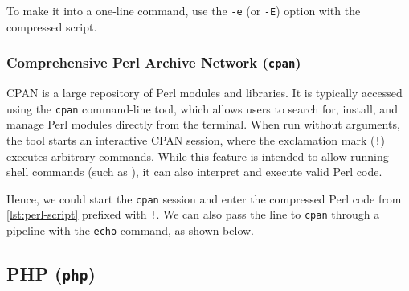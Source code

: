 


To make it into a one-line command, use the \texttt{-e} (or \texttt{-E}) option with the compressed script. \cite{perl-man}


\subsubsection{Comprehensive Perl Archive Network (\texttt{cpan})}
\label{cpan}


CPAN is a large repository of Perl modules and libraries. It is typically accessed using the \texttt{cpan} command-line tool, which allows users to search for, install, and manage Perl modules directly from the terminal. When run without arguments, the tool starts an interactive CPAN session, where the exclamation mark (\texttt{!}) executes arbitrary commands. While this feature is intended to allow running shell commands (such as ), it can also interpret and execute valid Perl code. \cite{cpan-man}

Hence, we could start the \texttt{cpan} session and enter the compressed Perl code from \cref{lst:perl-script} prefixed with \texttt{!}. We can also pass the line to \texttt{cpan} through a pipeline with the \texttt{echo} command, as shown below.




\subsection{PHP (\texttt{php})}

